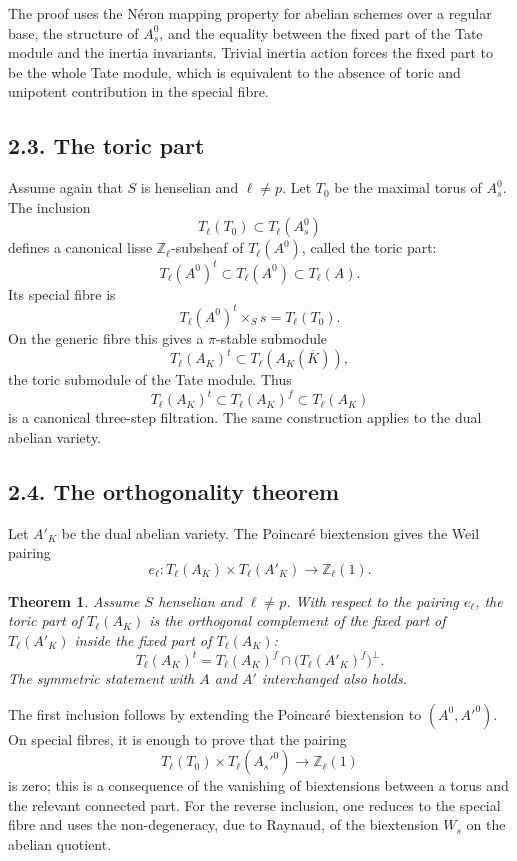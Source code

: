 \documentclass[11pt]{article}
\newtheorem{theorem}[proposition]{Theorem}
\newcommand{\bZ}{\mathbb Z}
\begin{document}
The proof uses the Néron mapping property for abelian schemes over a regular
base, the structure of \(A_s^0\), and the equality between the fixed part of the
Tate module and the inertia invariants. Trivial inertia action forces the fixed
part to be the whole Tate module, which is equivalent to the absence of toric and
unipotent contribution in the special fibre.

\subsection*{2.3. The toric part}

Assume again that \(S\) is henselian and \(\ell\neq p\). Let \(T_0\) be the
maximal torus of \(A_s^0\). The inclusion
\[
T_\ell(T_0)\subset T_\ell(A_s^0)
\]
defines a canonical lisse \(\bZ_\ell\)-subsheaf of \(T_\ell(A^0)\), called the
toric part:
\[
T_\ell(A^0)^t\subset T_\ell(A^0)\subset T_\ell(A).
\]
Its special fibre is
\[
T_\ell(A^0)^t\times_S s=T_\ell(T_0).
\]
On the generic fibre this gives a \(\pi\)-stable submodule
\[
T_\ell(A_K)^t\subset T_\ell(A_K(\overline K)),
\]
the toric submodule of the Tate module. Thus
\[
T_\ell(A_K)^t\subset T_\ell(A_K)^f\subset T_\ell(A_K)
\]
is a canonical three-step filtration. The same construction applies to the dual
abelian variety.

\subsection*{2.4. The orthogonality theorem}

Let \(A'_K\) be the dual abelian variety. The Poincaré biextension gives the
Weil pairing
\[
e_\ell:T_\ell(A_K)\times T_\ell(A'_K)\longrightarrow \bZ_\ell(1).
\]

\begin{theorem}
Assume \(S\) henselian and \(\ell\neq p\). With respect to the pairing
\(e_\ell\), the toric part of \(T_\ell(A_K)\) is the orthogonal complement of
the fixed part of \(T_\ell(A'_K)\) inside the fixed part of \(T_\ell(A_K)\):
\[
T_\ell(A_K)^t
=
T_\ell(A_K)^f\cap\bigl(T_\ell(A'_K)^f\bigr)^\perp.
\]
The symmetric statement with \(A\) and \(A'\) interchanged also holds.
\end{theorem}

The first inclusion follows by extending the Poincaré biextension to
\((A^0,A'^0)\). On special fibres, it is enough to prove that the pairing
\[
T_\ell(T_0)\times T_\ell(A_s'^0)\to \bZ_\ell(1)
\]
is zero; this is a consequence of the vanishing of biextensions between a torus
and the relevant connected part. For the reverse inclusion, one reduces to the
special fibre and uses the non-degeneracy, due to Raynaud, of the biextension
\(W_s\) on the abelian quotient.
\end{document}
